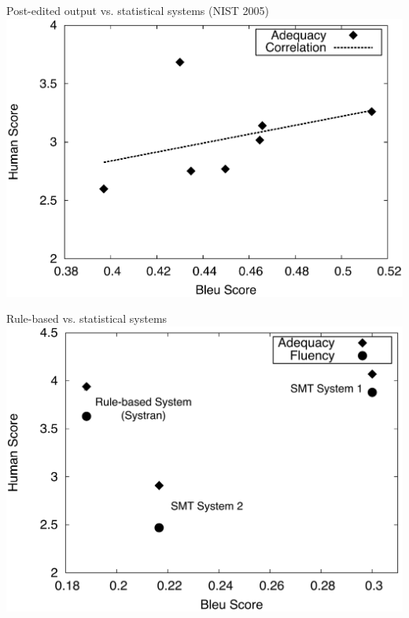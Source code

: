 \documentclass[landscape]{slides}
\begin{document}
\begin{center}
Post-edited output vs. statistical systems (NIST 2005)\\[5mm]
\includegraphics[scale=0.7]{correlation_graph_adequacy.pdf}
\end{center}


\begin{center}
Rule-based vs. statistical systems\\[5mm]
\includegraphics[scale=0.7]{systrans_graph.pdf}
\end{center}

\end{document}
